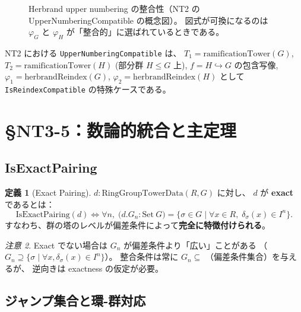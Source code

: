 \documentclass[a4paper,11pt]{ltjsarticle}
\theoremstyle{definition}
\newtheorem{definition}{定義}[section]
\theoremstyle{plain}
\theoremstyle{remark}
\newtheorem{remark}[definition]{注意}
\newcommand{\ST}{\mathsf{ST}}
\newcommand{\reindex}{\mathrm{reindex}}
\newcommand{\OD}{\mathbb{N}^{\mathrm{op}}}
\begin{document}
\begin{figure}[h]
\centering
{}
\caption{Herbrand upper numbering の整合性（NT2 の UpperNumberingCompatible の概念図）。
図式が可換になるのは $\varphi_G$ と $\varphi_H$ が「整合的」に選ばれているときである。}
\end{figure}

NT2 における \texttt{UpperNumberingCompatible} は、
$T_1 = \mathrm{ramificationTower}(G)$,
$T_2 = \mathrm{ramificationTower}(H)$ (部分群 $H \leq G$ 上),
$f = H \hookrightarrow G$ の包含写像,
$\varphi_1 = \mathrm{herbrandReindex}(G)$,
$\varphi_2 = \mathrm{herbrandReindex}(H)$
として \texttt{IsReindexCompatible} の特殊ケースである。

\section{\S NT3-5：数論的統合と主定理}

\subsection{IsExactPairing}

\begin{definition}[Exact Pairing]
$d : \mathrm{RingGroupTowerData}(R, G)$ に対し、
$d$ が \textbf{exact} であるとは：
\[
\mathrm{IsExactPairing}(d) \iff \forall n,\;
\bigl(d.G_n : \text{Set}~G\bigr) =
\bigl\{\sigma \in G \;\big|\; \forall x \in R,\; \delta_\sigma(x) \in I^n\bigr\}.
\]
すなわち、群の塔のレベルが偏差条件によって\textbf{完全に特徴付けられる}。
\end{definition}

\begin{remark}
Exact でない場合は $G_n$ が偏差条件より「広い」ことがある
（$G_n \supseteq \{\sigma \mid \forall x, \delta_\sigma(x) \in I^n\}$）。
整合条件は常に $G_n \subseteq $ （偏差条件集合）を与えるが、
逆向きは exactness の仮定が必要。
\end{remark}

\subsection{ジャンプ集合と環-群対応}
\end{document}
